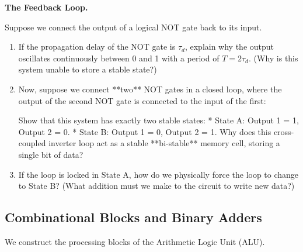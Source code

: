 \documentclass[12pt, a4paper]{book}
\begin{document}
\begin{puzzlebox}
\textbf{The Feedback Loop.}

Suppose we connect the output of a logical NOT gate back to its input.
\begin{enumerate}[label=(\alph*), leftmargin=*]
  \item If the propagation delay of the NOT gate is $\tau_d$, explain why the output oscillates continuously between 0 and 1 with a period of $T = 2\tau_d$. (Why is this system unable to store a stable state?)
  \item Now, suppose we connect **two** NOT gates in a closed loop, where the output of the second NOT gate is connected to the input of the first:
  \begin{center}
  \end{center}
        Show that this system has exactly two stable states:
        * State A: Output 1 = 1, Output 2 = 0.
        * State B: Output 1 = 0, Output 2 = 1.
        Why does this cross-coupled inverter loop act as a stable **bi-stable** memory cell, storing a single bit of data?
  \item If the loop is locked in State A, how do we physically force the loop to change to State B? (What addition must we make to the circuit to write new data?)
\end{enumerate}
\end{puzzlebox}

\subsection{Combinational Blocks and Binary Adders}

We construct the processing blocks of the Arithmetic Logic Unit (ALU).
\end{document}
